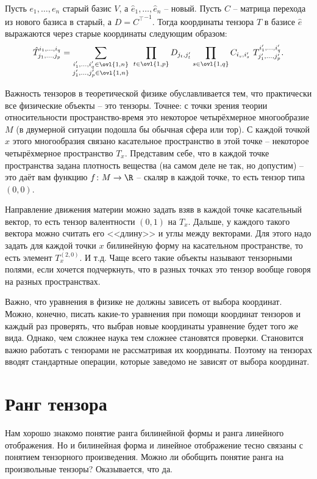 \thrm Пусть $e_1,\dots,e_n$ старый базис $V$, а $\hat{e}_1,\dots,\hat{e}_n$ -- новый. Пусть $C$ -- матрица перехода из нового базиса в старый, а $D={C^{\top}}^{-1}$. Тогда координаты тензора $T$ в базисе $\hat{e}$ выражаются через старые координаты следующим образом:
$$\hat{T}_{j_1,\dots,j_p}^{i_1,\dots,i_q}=\sum_{\substack{i'_1,\dots,i'_q \in \ovl{1,n}\\ j'_1,\dots,j'_p \in \ovl{1,n}}} \,\,
\prod_{t\in \ovl{1,p}} D_{j_t,j'_t} \prod_{s\in \ovl{1,q}} C_{i_s,i'_s}  \,\,T_{j'_1,\dots,j'_p}^{i'_1,\dots,i'_q}.$$
\ethrm

Важность тензоров в теоретической физике обуславливается тем, что практически все физические объекты -- это тензоры. Точнее: с точки зрения теории относительности пространство-время это некоторое четырёхмерное многообразие $M$ (в двумерной ситуации подошла бы обычная сфера или тор). С каждой точкой $x$ этого многообразия связано касательное пространство в этой точке -- некоторое четырёхмерное пространство $T_x$. Представим себе, что в каждой точке пространства задана плотность вещества (на самом деле не так, но допустим) -- это даёт вам функцию $f \colon M \to \R$ -- скаляр в каждой точке, то есть тензор типа $(0,0)$. 

Направление движения материи можно задать взяв в каждой точке касательный вектор, то есть тензор валентности $(0,1)$ на $T_x$. Дальше, у каждого такого вектора можно считать его <<длину>> и углы между векторами. Для этого надо задать для каждой точки $x$ билинейную форму на касательном пространстве, то есть элемент $T_x^{(2,0)}$. И т.д. Чаще всего такие объекты называют тензорными полями, если хочется подчеркнуть, что в разных точках это тензор вообще говоря на разных пространствах.

Важно, что уравнения в физике не должны зависеть от выбора координат. Можно, конечно, писать какие-то уравнения при помощи координат тензоров и каждый раз проверять, что выбрав новые координаты уравнение будет того же вида. Однако, чем сложнее наука тем сложнее становятся проверки. Становится важно работать с тензорами не рассматривая их координаты. Поэтому на тензорах вводят стандартные операции, которые заведомо не зависят от выбора координат.


\section{Ранг тензора}

Нам хорошо знакомо понятие ранга билинейной формы и ранга линейного отображения. Но и билинейная форма и линейное отображение тесно связаны с понятием тензорного произведения. Можно ли обобщить понятие ранга на произвольные тензоры? Оказывается, что да. 

